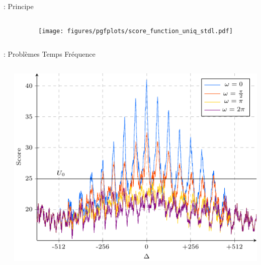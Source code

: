 \documentclass[../main.tex]{subfiles}
\begin{document}
\begin{frame}{\subsecname : {Principe}}
  \begin{columns}
    \begin{column}{.4\linewidth}

    \end{column}
    \begin{column}{.6\linewidth}
      \texttt{[image: figures/pgfplots/score\_function\_uniq\_stdl.pdf]}
    \end{column}
  \end{columns}
\end{frame}



\begin{frame}{\subsecname : {Problèmes Temps Fréquence}}
  \begin{columns}
    \begin{column}{.4\linewidth}

    \end{column}
    \begin{column}{.6\linewidth}
      \includegraphics[width=\linewidth, height=.75\textheight, keepaspectratio=true]{figures/pgfplots/score_function_stdl.pdf}
    \end{column}
  \end{columns}
\end{frame}
\end{document}

